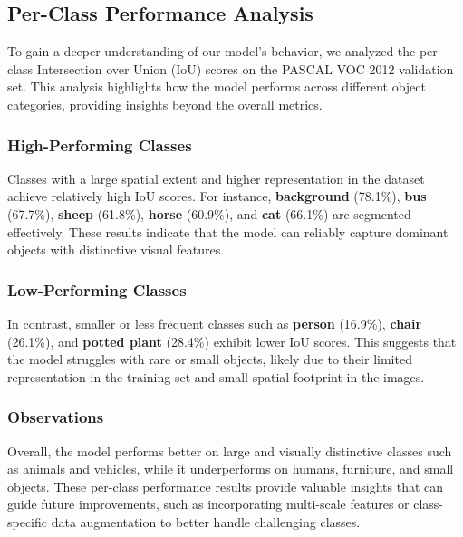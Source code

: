 \subsection{Per-Class Performance Analysis}
\label{subsec:per_class_performance_analysis}

To gain a deeper understanding of our model’s behavior, we analyzed the per-class Intersection over Union (IoU) scores on the PASCAL VOC 2012 validation set. This analysis highlights how the model performs across different object categories, providing insights beyond the overall metrics.

\subsubsection{High-Performing Classes}

Classes with a large spatial extent and higher representation in the dataset achieve relatively high IoU scores. For instance, \textbf{background} (78.1\%), \textbf{bus} (67.7\%), \textbf{sheep} (61.8\%), \textbf{horse} (60.9\%), and \textbf{cat} (66.1\%) are segmented effectively. These results indicate that the model can reliably capture dominant objects with distinctive visual features.

\subsubsection{Low-Performing Classes}

In contrast, smaller or less frequent classes such as \textbf{person} (16.9\%), \textbf{chair} (26.1\%), and \textbf{potted plant} (28.4\%) exhibit lower IoU scores. This suggests that the model struggles with rare or small objects, likely due to their limited representation in the training set and small spatial footprint in the images.

\subsubsection{Observations}

Overall, the model performs better on large and visually distinctive classes such as animals and vehicles, while it underperforms on humans, furniture, and small objects. These per-class performance results provide valuable insights that can guide future improvements, such as incorporating multi-scale features or class-specific data augmentation to better handle challenging classes.

